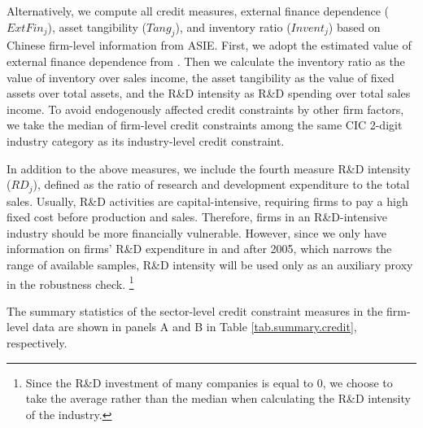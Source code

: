 \documentclass[12pt]{article}
\begin{document}
Alternatively, we compute all credit measures, external finance dependence ($ExtFin_j$), asset tangibility ($Tang_j$), and inventory ratio ($Invent_j$) based on Chinese firm-level information from ASIE. First, we adopt the estimated value of external finance dependence from \cite{fan-lai-li2015}. Then we calculate the inventory ratio as the value of inventory over sales income, the asset tangibility as the value of fixed assets over total assets, and the R\&D intensity as R\&D spending over total sales income. To avoid endogenously affected credit constraints by other firm factors, we take the median of firm-level credit constraints among the same CIC 2-digit industry category as its industry-level credit constraint. 

In addition to the above measures, we include the fourth measure R\&D intensity ($RD_j$), defined as the ratio of research and development expenditure to the total sales. Usually, R\&D activities are capital-intensive, requiring firms to pay a high fixed cost before production and sales. Therefore, firms in an R\&D-intensive industry should be more financially vulnerable. However, since we only have information on firms' R\&D expenditure in and after 2005, which narrows the range of available samples, R\&D intensity will be used only as an auxiliary proxy in the robustness check. \footnote{Since the R\&D investment of many companies is equal to 0, we choose to take the average rather than the median when calculating the R\&D intensity of the industry.}

The summary statistics of the sector-level credit constraint measures in the firm-level data are shown in panels A and B in Table \ref{tab.summary.credit}, respectively.
\end{document}
